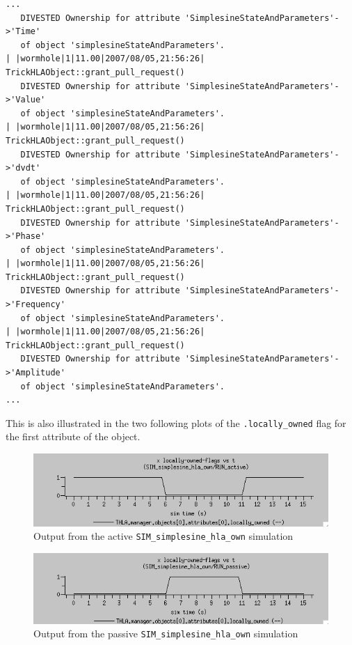 \begin{lstlisting}[numbers=none,caption={Output stream from the passive ownerhsip transfer simulation}]
...
   DIVESTED Ownership for attribute 'SimplesineStateAndParameters'->'Time'
   of object 'simplesineStateAndParameters'.
| |wormhole|1|11.00|2007/08/05,21:56:26| TrickHLAObject::grant_pull_request()
   DIVESTED Ownership for attribute 'SimplesineStateAndParameters'->'Value'
   of object 'simplesineStateAndParameters'.
| |wormhole|1|11.00|2007/08/05,21:56:26| TrickHLAObject::grant_pull_request()
   DIVESTED Ownership for attribute 'SimplesineStateAndParameters'->'dvdt'
   of object 'simplesineStateAndParameters'.
| |wormhole|1|11.00|2007/08/05,21:56:26| TrickHLAObject::grant_pull_request()
   DIVESTED Ownership for attribute 'SimplesineStateAndParameters'->'Phase'
   of object 'simplesineStateAndParameters'.
| |wormhole|1|11.00|2007/08/05,21:56:26| TrickHLAObject::grant_pull_request()
   DIVESTED Ownership for attribute 'SimplesineStateAndParameters'->'Frequency'
   of object 'simplesineStateAndParameters'.
| |wormhole|1|11.00|2007/08/05,21:56:26| TrickHLAObject::grant_pull_request()
   DIVESTED Ownership for attribute 'SimplesineStateAndParameters'->'Amplitude'
   of object 'simplesineStateAndParameters'.
...
\end{lstlisting}

This is also illustrated in the two following plots of the
{\tt .locally\_owned} flag for the first attribute of the object.

\clearpage

\begin{figure}[h]
  \begin{center}
    \includegraphics[width=5.5in]{TrickHLAUser-SIM-hla-own-active.png}
  \end{center}
\caption{Output from the active {\tt SIM\_simplesine\_hla\_own} simulation}
\label{fig:hla-own-active-output}
\end{figure}


\begin{figure}[h]
  \begin{center}
    \includegraphics[width=5.5in]{TrickHLAUser-SIM-hla-own-passive.png}
  \end{center}
\caption{Output from the passive {\tt SIM\_simplesine\_hla\_own} simulation}
\label{fig:hla-own-passive-output}
\end{figure}

\clearpage
